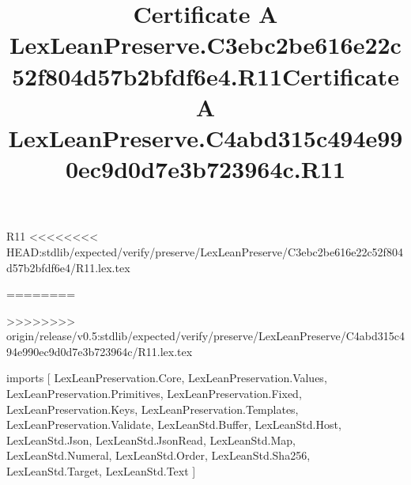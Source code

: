 \begin{lexlean}{R11}
<<<<<<<< HEAD:stdlib/expected/verify/preserve/LexLeanPreserve/C3ebc2be616e22c52f804d57b2bfdf6e4/R11.lex.tex
\title{Certificate A LexLeanPreserve.C3ebc2be616e22c52f804d57b2bfdf6e4.R11}
========
\title{Certificate A LexLeanPreserve.C4abd315c494e990ec9d0d7e3b723964c.R11}
>>>>>>>> origin/release/v0.5:stdlib/expected/verify/preserve/LexLeanPreserve/C4abd315c494e990ec9d0d7e3b723964c/R11.lex.tex
\begin{coremodule}
imports [
  LexLeanPreservation.Core,
  LexLeanPreservation.Values,
  LexLeanPreservation.Primitives,
  LexLeanPreservation.Fixed,
  LexLeanPreservation.Keys,
  LexLeanPreservation.Templates,
  LexLeanPreservation.Validate,
  LexLeanStd.Buffer,
  LexLeanStd.Host,
  LexLeanStd.Json,
  LexLeanStd.JsonRead,
  LexLeanStd.Map,
  LexLeanStd.Numeral,
  LexLeanStd.Order,
  LexLeanStd.Sha256,
  LexLeanStd.Target,
  LexLeanStd.Text
]


\end{coremodule}
\end{lexlean}
